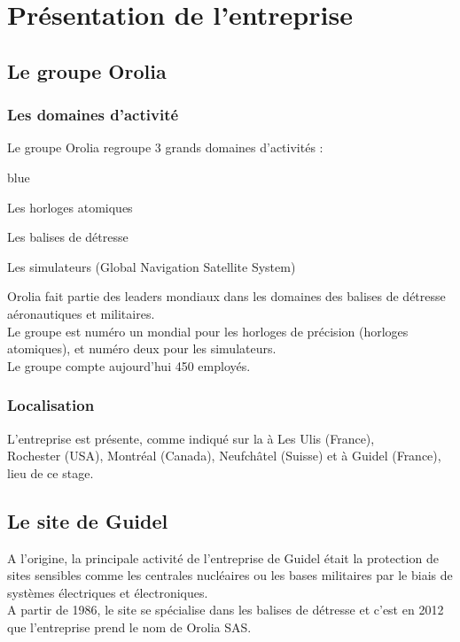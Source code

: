 \chapter{Présentation de l'entreprise}

\section{Le groupe Orolia}

\subsection{Les domaines d'activité}

Le groupe Orolia regroupe 3 grands domaines d'activités : 

\begin{items}{blue}{\Circle}
  \item Les horloges atomiques
  \item Les balises de détresse 
  \item Les simulateurs   (Global Navigation Satellite System)
\end{items}

Orolia fait partie des leaders mondiaux dans les domaines des balises de détresse aéronautiques et militaires.\\
Le groupe est numéro un mondial pour les horloges de précision (horloges atomiques), et numéro deux pour les simulateurs.\\

Le groupe compte aujourd’hui 450 employés.

\subsection{Localisation}

L'entreprise est présente, comme indiqué sur la  à Les Ulis (France),\\Rochester (USA), Montréal (Canada), Neufchâtel (Suisse) et à Guidel (France), lieu de ce stage.



\section{Le site de Guidel}

A l'origine, la principale activité de l’entreprise de Guidel était la protection de sites sensibles comme les centrales nucléaires ou les bases militaires par le biais de systèmes électriques et électroniques.\\
A partir de 1986, le site se spécialise dans les balises de détresse et c'est en 2012 que l'entreprise prend le nom de Orolia SAS.


